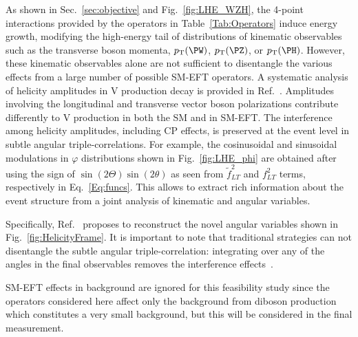 \documentclass[a4paper,11pt]{article}
\renewcommand{\PV}{{{{V}}}\xspace}
\newcommand{\VH}{{{\PV}{\PH}}\xspace}
\begin{document}
As shown in Sec.~\ref{sec:objective} and Fig.~\ref{fig:LHE_WZH}, the 4-point interactions provided by the operators in Table~\ref{Tab:Operators} induce  energy growth, modifying the high-energy tail of distributions of kinematic observables such as the transverse boson momenta, $\pt(\PW)$, $\pt(\PZ)$, or $\pt(\PH)$. 
However, these kinematic observables alone are not sufficient to disentangle the various effects from a large number of possible SM-EFT operators. 
A systematic analysis of helicity amplitudes in \VH production decay is provided in Ref.~\cite{Banerjee:2019twi}. 
Amplitudes involving the longitudinal and transverse vector boson polarizations contribute differently to \VH production in both the SM and in SM-EFT. 
The interference among helicity amplitudes, including CP effects, is preserved at the event level in subtle angular triple-correlations. 
For example, the cosinusoidal and sinusoidal modulations in $\varphi$ distributions shown in Fig.~\ref{fig:LHE_phi} are obtained after using the sign of $\sin\left(2\Theta\right)\sin\left(2\theta\right)$ as seen from $\tilde{f}^2_{LT}$ and $f^2_{LT}$ terms, respectively in  Eq.~\ref{Eq:funcs}. 
This allows to extract rich information about the event structure from a joint analysis of kinematic and angular variables.

Specifically, Ref.~\cite{Banerjee:2019twi} proposes to reconstruct the novel angular variables shown in Fig.~\ref{fig:HelicityFrame}. 
It is important to note that traditional strategies can not disentangle the subtle angular triple-correlation: integrating over any of the angles in the final observables removes the interference effects~\cite{Panico:2017frx}.


SM-EFT effects in background are ignored for this feasibility study 
since the operators considered here affect only the background from diboson production which constitutes a very small background, but this will be considered in the final measurement.
\end{document}
